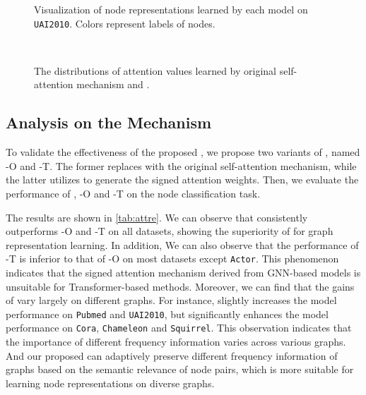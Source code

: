 \documentclass[sigconf, screen]{acmart}
\begin{document}
\begin{figure*} [ht]
	\centering
	\caption{Visualization of node representations learned by each model on \texttt{UAI2010}. Colors represent labels of nodes.}
	\label{fig:vision}
\end{figure*}







%
 \begin{figure} [ht]
	\centering
  \\

	\caption{The distributions of attention values learned by original self-attention mechanism and \saname.}
	\label{fig:viattention}
\end{figure}



%
 
\subsection{Analysis on the \saname Mechanism}
To validate the effectiveness of the proposed \saname, we propose two variants of \name, named \name-O and \name-T.
The former replaces \saname with the original self-attention mechanism, while the latter utilizes  to generate the signed attention weights.
Then, we evaluate the performance of \name, \name-O and \name-T on the node classification task. 

The results are shown in \autoref{tab:attre}.
We can observe that \name consistently outperforms \name-O and \name-T on all datasets, showing the superiority of \saname for graph representation learning.    
In addition, We can also observe that the performance of \name-T is inferior to that of \name-O on most datasets except \texttt{Actor}.
This phenomenon indicates that the signed attention mechanism derived from GNN-based models is unsuitable for Transformer-based methods. 
Moreover, we can find that the gains of \saname vary largely on different graphs.
For instance, \saname slightly increases the model performance on \texttt{Pubmed} and \texttt{UAI2010}, but significantly enhances the model performance on \texttt{Cora}, \texttt{Chameleon} and \texttt{Squirrel}. 
This observation indicates that the importance of different frequency information varies across various graphs.
And our proposed \saname can adaptively preserve different frequency information of graphs based on the semantic relevance of node pairs, which is more suitable for learning node representations on diverse graphs.
\end{document}

